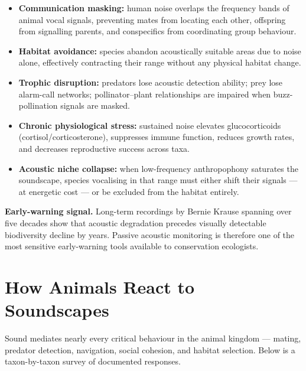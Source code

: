 \documentclass[12pt, a4paper]{article}
\begin{document}
\begin{itemize}[leftmargin=1.5em, itemsep=4pt]
  \item \textbf{Communication masking:} human noise overlaps the frequency bands of animal vocal
        signals, preventing mates from locating each other, offspring from signalling parents,
        and conspecifics from coordinating group behaviour.

  \item \textbf{Habitat avoidance:} species abandon acoustically suitable areas due to noise
        alone, effectively contracting their range without any physical habitat change.

  \item \textbf{Trophic disruption:} predators lose acoustic detection ability; prey lose
        alarm-call networks; pollinator--plant relationships are impaired when buzz-pollination
        signals are masked.

  \item \textbf{Chronic physiological stress:} sustained noise elevates glucocorticoids
        (cortisol/corticosterone), suppresses immune function, reduces growth rates, and
        decreases reproductive success across taxa.

  \item \textbf{Acoustic niche collapse:} when low-frequency anthropophony saturates the
        soundscape, species vocalising in that range must either shift their signals --- at
        energetic cost --- or be excluded from the habitat entirely.
\end{itemize}

\begin{warnbox}
\textbf{Early-warning signal.} Long-term recordings by Bernie Krause spanning over five decades
show that acoustic degradation precedes visually detectable biodiversity decline by years. Passive
acoustic monitoring is therefore one of the most sensitive early-warning tools available to
conservation ecologists.
\end{warnbox}

\newpage

\section{How Animals React to Soundscapes}

Sound mediates nearly every critical behaviour in the animal kingdom --- mating, predator
detection, navigation, social cohesion, and habitat selection. Below is a taxon-by-taxon
survey of documented responses.
\end{document}
